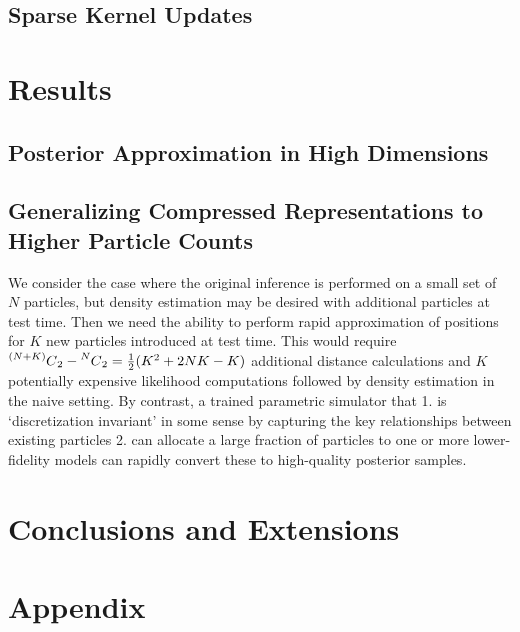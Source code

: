 \documentclass[12pt]{article}
\newcommand\Mycomb[2][^n]{\prescript{#1\mkern-0.5mu}{}C_{#2}}
\renewcommand{\[}{\left[}
\renewcommand{\]}{\right]}
\renewcommand{\(}{\left(}
\renewcommand{\)}{\right)}
\begin{document}

\subsection{Sparse Kernel Updates}

\section{Results}

\subsection{Posterior Approximation in High Dimensions}


\subsection{Generalizing Compressed Representations to Higher Particle Counts}
We consider the case where the original inference is performed on a small set of $N$ particles, but density estimation may be desired with additional particles at test time. 
Then we need the ability to perform rapid approximation of positions for $K$ new particles introduced at test time. 
This would require $\Mycomb[(N+K)]{2} - \Mycomb[N]{2} = \frac{1}{2}(K^2 + 2NK - K)$ additional distance calculations and $K$ potentially expensive likelihood computations followed by density estimation in the naive setting. 
By contrast, a trained parametric simulator that 1. is `discretization invariant' in some sense by capturing the key relationships between existing particles 2. can allocate a large fraction of particles to one or more lower-fidelity models can rapidly convert these to high-quality posterior samples.

\subsection{}

\section{Conclusions and Extensions}






\section*{Appendix}
\end{document}
